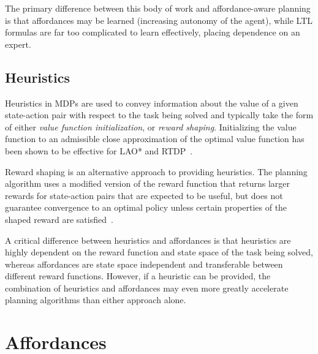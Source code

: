 \documentclass[conference]{IEEEtran}
\begin{document}
The primary difference between this body of work and affordance-aware planning is that affordances may be learned (increasing autonomy of the agent), while LTL formulas are far too complicated to learn effectively, placing dependence on an expert.

\subsection{Heuristics}
Heuristics in MDPs are used to convey information about the value of a given state-action pair with respect to the task being solved and typically take the form of either {\em value function initialization},
or {\em reward shaping}. Initializing the value function to an admissible close approximation of the optimal value function has been shown to be effective for LAO* and RTDP~\cite{Hansen:1999qf}.

Reward shaping is an alternative approach to providing heuristics. The planning algorithm uses a modified version of the reward function that returns larger rewards for state-action pairs that are expected to be useful, but does not guarantee convergence to an optimal policy unless certain properties of the shaped reward are satisfied~\cite{potshap}.

A critical difference between heuristics and affordances is that heuristics are highly dependent on the reward function and state space of the task being solved, whereas affordances are state space independent and transferable between different reward functions. However, if a heuristic can be provided, the combination of heuristics and affordances may even more greatly accelerate planning algorithms than either approach alone.

\section{Affordances}
\label{sec:affordances}
\end{document}
